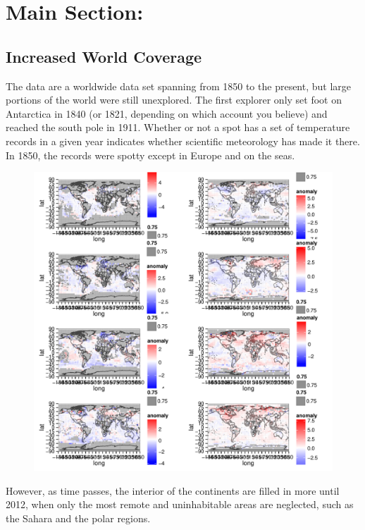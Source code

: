 \documentclass{article}\usepackage{graphicx, color}
\newenvironment{knitrout}{}{} %
\begin{document}
\section{Main Section:}
\subsection*{Increased World Coverage}
The data are a worldwide data set spanning from 1850 to the present, but large portions of the world were still unexplored. The first explorer only set foot on Antarctica in 1840 (or 1821, depending on which account you believe) and reached the south pole in 1911. Whether or not a spot has a set of temperature records in a given year indicates whether scientific meteorology has made it there. In 1850, the records were spotty except in Europe and on the seas.
\begin{figure}[H]
\begin{knitrout}
\color{fgcolor}\includegraphics[width=\linewidth]{figure/chunk2} 
\end{knitrout}

\end{figure}

However, as time passes, the interior of the continents are filled in more until 2012, when only the most remote and uninhabitable areas are neglected, such as the Sahara and the polar regions.
\end{document}
